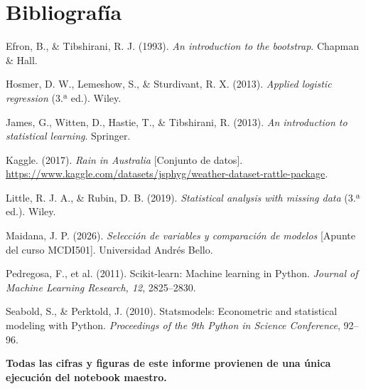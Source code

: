 \documentclass[10pt,a4paper]{article}
\begin{document}
\section{Bibliografía}
\footnotesize
Efron, B., \& Tibshirani, R. J. (1993). \textit{An introduction to the bootstrap}. Chapman \& Hall.\par
Hosmer, D. W., Lemeshow, S., \& Sturdivant, R. X. (2013). \textit{Applied logistic regression} (3.ª ed.). Wiley.\par
James, G., Witten, D., Hastie, T., \& Tibshirani, R. (2013). \textit{An introduction to statistical learning}. Springer.\par
Kaggle. (2017). \textit{Rain in Australia} [Conjunto de datos]. \url{https://www.kaggle.com/datasets/jsphyg/weather-dataset-rattle-package}.\par
Little, R. J. A., \& Rubin, D. B. (2019). \textit{Statistical analysis with missing data} (3.ª ed.). Wiley.\par
Maidana, J. P. (2026). \textit{Selección de variables y comparación de modelos} [Apunte del curso MCDI501]. Universidad Andrés Bello.\par
Pedregosa, F., et al. (2011). Scikit-learn: Machine learning in Python. \textit{Journal of Machine Learning Research, 12}, 2825--2830.\par
Seabold, S., \& Perktold, J. (2010). Statsmodels: Econometric and statistical modeling with Python. \textit{Proceedings of the 9th Python in Science Conference}, 92--96.\par

\vfill
\begin{center}\small\bfseries Todas las cifras y figuras de este informe provienen de una única ejecución del notebook maestro.\end{center}
\end{document}
